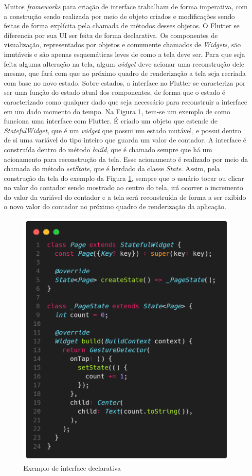 \documentclass[12pt, %
openright, 
oneside, %
a4paper,    %
brazil]{facom-ufu-abntex2}
\begin{document}
Muitos \textit{frameworks} para criação de interface trabalham de forma imperativa, com a construção sendo realizada por meio de objeto criados e modificações sendo feitas de forma explícita pela chamada de métodos desses objetos. O Flutter se diferencia por sua UI ser feita de forma declarativa. Os componentes de visualização, representados por objetos e comumente chamados de \textit{Widgets}, são imutáveis e são apenas esquemáticas leves de como a tela deve ser. Para que seja feita alguma alteração na tela, algum \textit{widget} deve acionar uma reconstrução dele mesmo, que fará com que no próximo quadro de renderização a tela seja recriada com base no novo estado. Sobre estados, a interface no Flutter se caracteriza por ser uma função do estado atual dos componentes, de forma que o estado é caracterizado como qualquer dado que seja necessário para reconstruir a interface em um dado momento do tempo. Na Figura \ref{fig:counter_example}, tem-se um exemplo de como funciona uma interface com Flutter. É criado um objeto que estende de \textit{StatefulWidget}, que é um \textit{widget} que possui um estado mutável, e possui dentro de si uma variável do tipo inteiro que guarda um valor de contador. A interface é construída dentro do método \textit{build}, que é chamado sempre que há um acionamento para reconstrução da tela. Esse acionamento é realizado por meio da chamada do método \textit{setState}, que é herdado da classe \textit{State}. Assim, pela construção da tela do exemplo da Figura \ref{fig:counter_example}, sempre que o usuário tocar ou clicar no valor do contador sendo mostrado ao centro do tela, irá ocorrer o incremento do valor da variável do contador e a tela será reconstruída de forma a ser exibido o novo valor do contador no próximo quadro de renderização da aplicação.

\begin{figure}[ht]
    \centering
    \includegraphics[width=.5\textwidth, trim={0 30 0 100}, clip]{figures/bibliographical_review/counter_example.png}
    \caption{Exemplo de interface declarativa}
    \label{fig:counter_example}
\end{figure}
\end{document}

